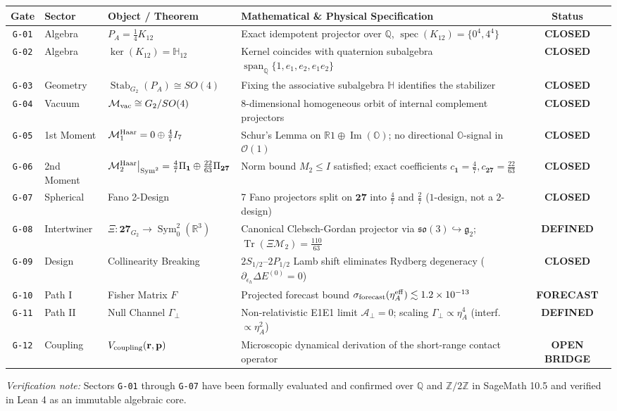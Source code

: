\documentclass[11pt,a4paper]{article}
\newcommand{\statusClosed}{\textbf{\textcolor{closedGreen}{CLOSED}}}
\newcommand{\statusDefined}{\textbf{\textcolor{definedBlue}{DEFINED}}}
\newcommand{\statusForecast}{\textbf{\textcolor{forecastOrange}{FORECAST}}}
\newcommand{\statusOpen}{\textbf{\textcolor{openRed}{OPEN BRIDGE}}}
\begin{document}
\begin{table}[h!]
\centering
\small
\begin{tabularx}{\textwidth}{@{} c l l X c @{}}
\toprule
\textbf{Gate} & \textbf{Sector} & \textbf{Object / Theorem} & \textbf{Mathematical \& Physical Specification} & \textbf{Status} \\
\midrule
\texttt{G-01} & Algebra & $P_A = \frac{1}{4}K_{12}$ & Exact idempotent projector over $\mathbb{Q}$, $\operatorname{spec}(K_{12}) = \{0^4, 4^4\}$ & \statusClosed \\
\texttt{G-02} & Algebra & $\ker(K_{12}) = \mathbb{H}_{12}$ & Kernel coincides with quaternion subalgebra $\operatorname{span}_{\mathbb{Q}}\{1, e_1, e_2, e_1e_2\}$ & \statusClosed \\
\texttt{G-03} & Geometry & $\operatorname{Stab}_{G_2}(P_A) \cong SO(4)$ & Fixing the associative subalgebra $\mathbb{H}$ identifies the stabilizer & \statusClosed \\
\texttt{G-04} & Vacuum & $\mathcal{M}_{\rm vac} \cong G_2/SO(4)$ & 8-dimensional homogeneous orbit of internal complement projectors & \statusClosed \\
\texttt{G-05} & 1st Moment & $\mathcal{M}_1^{\rm Haar} = 0 \oplus \frac{4}{7}I_7$ & Schur's Lemma on $\mathbb{R}1 \oplus \operatorname{Im}(\mathbb{O})$; no directional $\mathbb{O}$-signal in $\mathcal{O}(1)$ & \statusClosed \\
\texttt{G-06} & 2nd Moment & $\mathcal{M}_2^{\rm Haar}\big|_{\operatorname{Sym}^2} = \frac{4}{7}\Pi_{\mathbf{1}} \oplus \frac{22}{63}\Pi_{\mathbf{27}}$ & Norm bound $M_2 \le I$ satisfied; exact coefficients $c_{\mathbf{1}}=\frac{4}{7}, c_{\mathbf{27}}=\frac{22}{63}$ & \statusClosed \\
\texttt{G-07} & Spherical & Fano 2-Design & 7 Fano projectors split on $\mathbf{27}$ into $\frac{4}{7}$ and $\frac{2}{7}$ ($1$-design, not a $2$-design) & \statusClosed \\
\texttt{G-08} & Intertwiner & $\Xi : \mathbf{27}_{G_2} \to \operatorname{Sym}_0^2(\mathbb{R}^3)$ & Canonical Clebsch-Gordan projector via $\mathfrak{so}(3) \hookrightarrow \mathfrak{g}_2$; $\operatorname{Tr}(\Xi \mathcal{M}_2) = \frac{110}{63}$ & \statusDefined \\
\texttt{G-09} & Design & Collinearity Breaking & $2S_{1/2}\text{--}2P_{1/2}$ Lamb shift eliminates Rydberg degeneracy ($\partial_{\epsilon_h}\Delta E^{(0)}=0$) & \statusClosed \\
\texttt{G-10} & Path I & Fisher Matrix $F$ & Projected forecast bound $\sigma_{\rm forecast}(\eta_A^{\rm eff}) \lesssim 1.2 \times 10^{-13}$ & \statusForecast \\
\texttt{G-11} & Path II & Null Channel $\Gamma_\perp$ & Non-relativistic E1E1 limit $\mathcal{A}_\perp=0$; scaling $\Gamma_\perp \propto \eta_A^4$ (interf. $\propto \eta_A^2$) & \statusDefined \\
\texttt{G-12} & Coupling & $V_{\rm coupling}(\mathbf{r}, \mathbf{p})$ & Microscopic dynamical derivation of the short-range contact operator & \statusOpen \\
\bottomrule
\end{tabularx}
\end{table}

\vfill
\noindent\footnotesize\textit{Verification note:} Sectors \texttt{G-01} through \texttt{G-07} have been formally evaluated and confirmed over $\mathbb{Q}$ and $\mathbb{Z}/2\mathbb{Z}$ in SageMath 10.5 and verified in Lean 4 as an immutable algebraic core.
\end{document}
